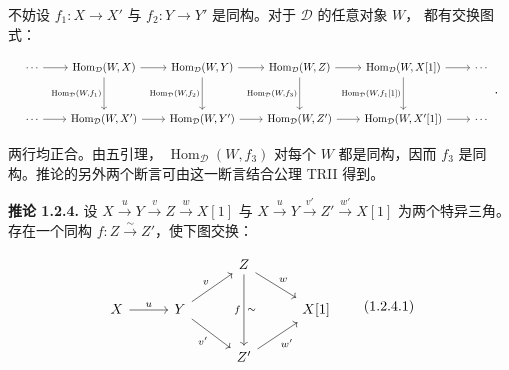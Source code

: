 \clearpage
{}%
\begingroup
\small
\setlength{\abovedisplayskip}{4pt plus 2pt minus 2pt}%
\setlength{\belowdisplayskip}{4pt plus 2pt minus 2pt}%

不妨设 $f_1\colon X\longrightarrow X'$ 与
$f_2\colon Y\longrightarrow Y'$ 是同构。对于 $\mathcal D$ 的任意对象 $W$，
都有交换图式：

\begin{equation*}
  \resizebox{0.98\linewidth}{!}{%
    $\begin{tikzcd}[ampersand replacement=\&,column sep=2.15em,row sep=3em]
      \cdots \arrow[r]
        \& \operatorname{Hom}_{\mathcal D}(W,X) \arrow[r] \arrow[d,"{\operatorname{Hom}_{\mathcal D}(W,f_1)}"']
        \& \operatorname{Hom}_{\mathcal D}(W,Y) \arrow[r] \arrow[d,"{\operatorname{Hom}_{\mathcal D}(W,f_2)}"']
        \& \operatorname{Hom}_{\mathcal D}(W,Z) \arrow[r] \arrow[d,"{\operatorname{Hom}_{\mathcal D}(W,f_3)}"']
        \& \operatorname{Hom}_{\mathcal D}(W,X[1]) \arrow[r] \arrow[d,"{\operatorname{Hom}_{\mathcal D}(W,f_1[1])}"']
        \& \cdots \\
      \cdots \arrow[r]
        \& \operatorname{Hom}_{\mathcal D}(W,X') \arrow[r]
        \& \operatorname{Hom}_{\mathcal D}(W,Y') \arrow[r]
        \& \operatorname{Hom}_{\mathcal D}(W,Z') \arrow[r]
        \& \operatorname{Hom}_{\mathcal D}(W,X'[1]) \arrow[r]
        \& \cdots
    \end{tikzcd}$%
  }\,.
\end{equation*}

两行均正合。由五引理，
$\operatorname{Hom}_{\mathcal D}(W,f_3)$ 对每个 $W$ 都是同构，因而 $f_3$
是同构。推论的另外两个断言可由这一断言结合公理 TRII 得到。

\medskip
\noindent\textbf{推论 1.2.4.}\quad
设
$X\xrightarrow{u}Y\xrightarrow{v}Z\xrightarrow{w}X[1]$ 与
$X\xrightarrow{u}Y\xrightarrow{v'}Z'\xrightarrow{w'}X[1]$
为两个特异三角。存在一个同构 $f\colon Z\xrightarrow{\sim}Z'$，使下图交换：

\begin{equation}
  \begin{tikzcd}[column sep=2.8em,row sep=1.7em]
    && Z \arrow[dr,"w"] \arrow[dd,"f"',"\sim"] & \\
    X \arrow[r,"u"] & Y \arrow[ur,"v"] \arrow[dr,"v'"'] && X[1] \\
    && Z' \arrow[ur,"w'"'] &
  \end{tikzcd}
  \tag{1.2.4.1}
\end{equation}

